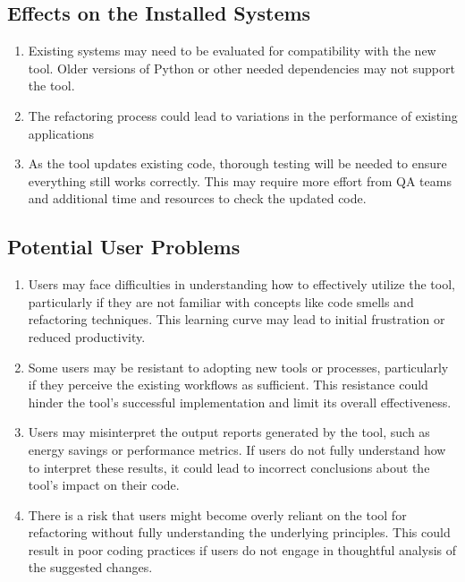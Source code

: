 \documentclass[12pt]{article}
\begin{document}
\subsection{Effects on the Installed Systems}
\begin{enumerate}
  \item Existing systems may need to be evaluated for compatibility with the new tool. Older versions of Python or other needed dependencies may not support the tool.
  \item The refactoring process could lead to variations in the performance of existing applications
  \item As the tool updates existing code, thorough testing will be needed to ensure everything still works correctly. This may require more effort from QA teams and additional time and resources to check the updated code.
\end{enumerate}

\subsection{Potential User Problems}
\begin{enumerate}
  \item Users may face difficulties in understanding how to effectively utilize the tool, particularly if they are not familiar with concepts like code smells and refactoring techniques. This learning curve may lead to initial frustration or reduced productivity.
  \item Some users may be resistant to adopting new tools or processes, particularly if they perceive the existing workflows as sufficient. This resistance could hinder the tool's successful implementation and limit its overall effectiveness.
  \item Users may misinterpret the output reports generated by the tool, such as energy savings or performance metrics. If users do not fully understand how to interpret these results, it could lead to incorrect conclusions about the tool's impact on their code.
  \item There is a risk that users might become overly reliant on the tool for refactoring without fully understanding the underlying principles. This could result in poor coding practices if users do not engage in thoughtful analysis of the suggested changes.
\end{enumerate}
\end{document}

